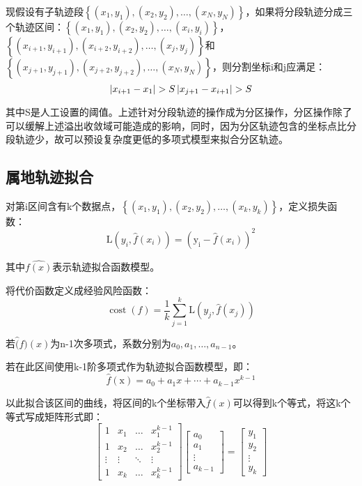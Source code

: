 现假设有子轨迹段$\left\{\left(x_{1}, y_{1}\right),\left(x_{2}, y_{2}\right), \dots,\left(x_{N}, y_{N}\right)\right\}$，如果将分段轨迹分成三个轨迹区间：$\left\{\left(x_{1}, y_{1}\right),\left(x_{2}, y_{2}\right), \dots,\left(x_{i}, y_{i}\right)\right\}$，$\left\{\left(x_{i+1}, y_{i+1}\right),\left(x_{i+2}, y_{i+2}\right), \ldots,\left(x_{j}, y_{j}\right)\right\}$和$\left\{\left(x_{j+1}, y_{j+1}\right),\left(x_{j+2}, y_{j+2}\right), \dots,\left(x_{N}, y_{N}\right)\right\}$，则分割坐标i和j应满足：
\[
\left|x_{i+1}-x_{1}\right|>S\\
\left|x_{j+1}-x_{i+1}\right|>S
\]

其中S是人工设置的阈值。上述针对分段轨迹的操作成为分区操作，分区操作除了可以缓解上述溢出收敛域可能造成的影响，同时，因为分区轨迹包含的坐标点比分段轨迹少，故可以预设复杂度更低的多项式模型来拟合分区轨迹。

\subsection{属地轨迹拟合}
对第i区间含有k个数据点，$\left\{\left(x_{1}, y_{1}\right),\left(x_{2}, y_{2}\right), \ldots,\left(x_{k}, y_{k}\right)\right\}$，定义损失函数：
\[
\mathrm{L}\left(y_{i}, \hat{f}\left(x_{i}\right)\right)=\left(\mathrm{y_i}-\hat{f}\left(x_{i}\right)\right)^{2}
\]

其中$\hat{f(x)}$表示轨迹拟合函数模型。

将代价函数定义成经验风险函数：
\begin{equation}
\label{ch3costwithoutl1}
\operatorname{cost}(f)=\frac{1}{k} \sum_{j=1}^{k} \mathrm{L}\left(y_{j}, \hat{f}\left(x_{j}\right)\right)
\end{equation}

若$\hat(f)(x)$为n-1次多项式，系数分别为$a_0,a_1,…,a_{n-1}$。

若在此区间使用k-1阶多项式作为轨迹拟合函数模型，即：
\[
\hat{f}\left( \text{x} \right) =a_0+a_1x+\cdots +a_{k-1}x^{k-1}
\]

以此拟合该区间的曲线，将区间的k个坐标带入$\hat{f}(x)$可以得到k个等式，将这k个等式写成矩阵形式即：
\[
\left[\begin{array}{cccc}
{1} & {x_{1}} & {\dots} & {x_{1}^{k-1}} \\
{1} & {x_{2}} & {\dots} & {x_{2}^{k-1}} \\
{\vdots} & {\vdots} & {\ddots} & {\vdots} \\
{1} & {x_{k}} & {\dots} & {x_{k}^{k-1}}
\end{array}\right]\left[\begin{array}{c}
{a_{0}} \\
{a_{1}} \\
{\vdots} \\
{a_{k-1}}
\end{array}\right]=\left[\begin{array}{c}
{y_{1}} \\
{y_{2}} \\
{\vdots} \\
{y_{k}}
\end{array}\right]
\]

